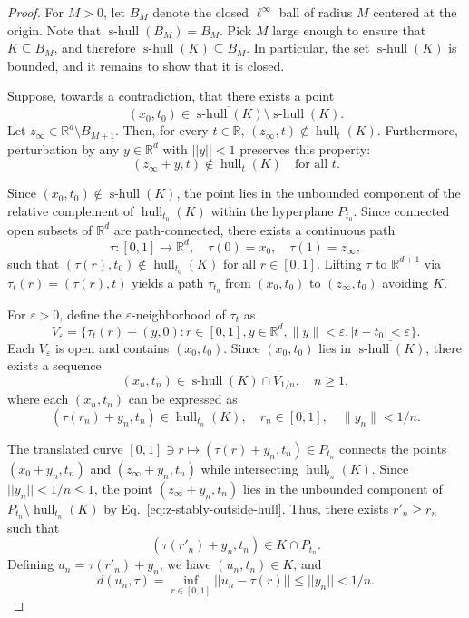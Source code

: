 \documentclass[12pt]{paper}
\numberwithin{equation}{section}
\theoremstyle{plain}
\theoremstyle{definition}
\newcommand{\R}{\mathbb{R}}
\newcommand{\Rd}{\mathbb{R}^{d}}
\DeclareMathOperator{\hull}{\mathrm{hull}}
\DeclareMathOperator{\shull}{\mathrm{s-hull}}
\newcommand{\norm}[1]{||#1||}
\renewcommand{\epsilon}{\varepsilon}
\begin{document}
\begin{proof}
  For \(M > 0\), let \(B_{M} \) denote the closed \(\ell^{\infty}\) ball of radius \(M\) centered at
  the origin.  Note that \(\shull(B_{M}) = B_{M}\). Pick \(M\) large enough to ensure that
  \(K \subseteq B_{M}\), and therefore \(\shull(K) \subseteq B_{M}\).  In particular, the set
  \(\shull(K)\) is bounded, and it remains to show that it is closed.

  Suppose, towards a contradiction, that there exists a point
  \[ (x_{0},t_{0})\in\overline{\shull(K)}\setminus\shull(K). \]
  Let \(z_{\infty}\in \Rd \setminus B_{M+1}\). Then, for every \(t \in \R\),
  \((z_{\infty},t)\notin\hull_{t}(K)\). Furthermore, perturbation by any \(y \in \Rd\)
  with \(\norm{y}<1\) preserves this property:
  \begin{equation}
    \label{eq:z-stably-outside-hull}
    (z_{\infty}+y,t)\notin\hull_{t}(K) \quad \text{for all } t.
  \end{equation}

  Since \((x_{0}, t_{0}) \notin \shull(K)\), the point lies in the unbounded component of the
  relative complement of \(\hull_{t_{0}}(K)\) within the hyperplane \(P_{t_{0}}\).  Since
  connected open subsets of \(\Rd\) are path-connected, there exists a continuous path
  \[
    \tau : [0,1] \to \Rd, \quad \tau(0) = x_{0}, \quad \tau(1) = z_{\infty},
  \]
  such that \((\tau(r), t_{0}) \notin \hull_{t_{0}}(K)\) for all \(r \in [0,1]\). Lifting \(\tau\)
  to \(\R^{d+1}\) via \(\tau_{t}(r) = (\tau(r), t)\) yields a path \(\tau_{t_{0}}\) from
  \((x_{0}, t_{0})\) to \((z_{\infty}, t_{0})\) avoiding \(K\).

  For \(\epsilon > 0\), define the \(\epsilon\)-neighborhood of \(\tau_t\) as
  \[
    V_{\epsilon} = \{\tau_{t}(r) + (y,0) : r \in [0,1], y \in \Rd, \|y\| <
    \epsilon, |t - t_{0}| < \epsilon\}.
  \]
  Each \(V_{\epsilon}\) is open and contains \((x_{0}, t_{0})\). Since
  \((x_{0}, t_{0})\) lies in \(\overline{\shull(K)}\), there exists a sequence
  \[
    (x_{n}, t_{n}) \in \shull(K) \cap V_{1/n}, \quad n \geq 1,
  \]
  where each \((x_{n}, t_{n})\) can be expressed as
  \[
    (\tau(r_n) + y_{n}, t_{n}) \in \hull_{t_{n}}(K), \quad r_n \in [0,1], \quad
    \|y_{n}\| < 1/n.
  \]

  The translated curve \( [0,1] \ni r \mapsto (\tau(r) + y_{n}, t_{n}) \in P_{t_{n}}\)
  connects the points \((x_{0} + y_{n}, t_{n})\) and
  \((z_{\infty} + y_{n}, t_{n})\) while intersecting \(\hull_{t_{n}}(K)\). Since
  \(\norm{y_{n}} < 1/n \le 1\), the point \((z_{\infty} + y_{n}, t_{n})\) lies in
  the unbounded component of \(P_{t_{n}} \setminus \hull_{t_{n}}(K)\) by
  Eq.~\eqref{eq:z-stably-outside-hull}. Thus, there exists \(r'_{n} \ge r_{n}\) such that
  \[(\tau(r'_{n}) + y_{n}, t_{n}) \in K \cap P_{t_{n}}.\]
  Defining \(u_{n} = \tau(r'_{n}) + y_{n}\), we have \((u_{n}, t_{n}) \in K\), and
  \begin{equation}
    \label{eq:xn-close-to-tau}
    d(u_{n}, \tau) = \inf_{r \in [0,1]} \norm{u_{n} - \tau(r)} \le \norm{y_{n}} < 1/n.
  \end{equation}


\end{proof}
\end{document}
